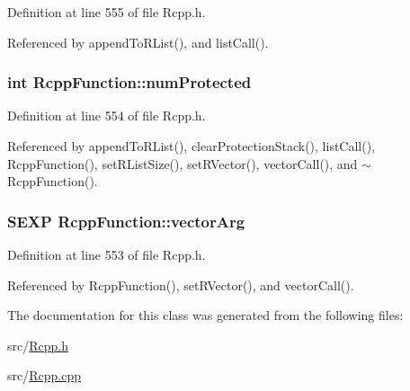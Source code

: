 Definition at line 555 of file Rcpp.h.

Referenced by appendToRList(), and listCall().\hypertarget{classRcppFunction_dc777e7d1628ccc4f531a8375f30f385}{
\subsubsection[{numProtected}]{\setlength{\rightskip}{0pt plus 5cm}int {\bf RcppFunction::numProtected}}}
\label{classRcppFunction_dc777e7d1628ccc4f531a8375f30f385}




Definition at line 554 of file Rcpp.h.

Referenced by appendToRList(), clearProtectionStack(), listCall(), RcppFunction(), setRListSize(), setRVector(), vectorCall(), and $\sim$RcppFunction().\hypertarget{classRcppFunction_0492c128c0f72cda44e679265b36b50e}{
\subsubsection[{vectorArg}]{\setlength{\rightskip}{0pt plus 5cm}SEXP {\bf RcppFunction::vectorArg}}}
\label{classRcppFunction_0492c128c0f72cda44e679265b36b50e}




Definition at line 553 of file Rcpp.h.

Referenced by RcppFunction(), setRVector(), and vectorCall().

The documentation for this class was generated from the following files:\begin{CompactItemize}
\item 
src/\hyperlink{Rcpp_8h}{Rcpp.h}\item 
src/\hyperlink{Rcpp_8cpp}{Rcpp.cpp}\end{CompactItemize}
